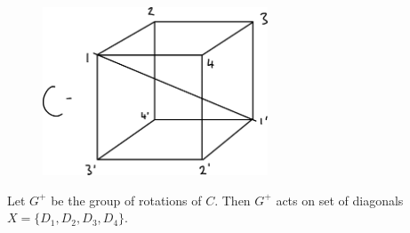 \begin{figure} 
    \centering 
    \includegraphics[height=5cm]{figures/07-cube} 
\end{figure}

Let $G^+$ be the group of rotations of $C$.
Then $G^+$ acts on set of diagonals $X = \{D_1, D_2, D_3, D_4\}$.

